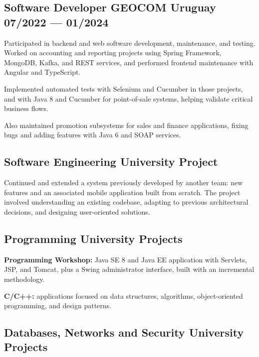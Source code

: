 \documentclass[letter,10pt]{article}
\begin{document}
\subsection{Software Developer \hfill GEOCOM Uruguay \hfill 07/2022 --- 01/2024}

Participated in backend and web software development, maintenance, and testing. Worked on accounting and reporting projects using Spring Framework, MongoDB, Kafka, and REST services, and performed frontend maintenance with Angular and TypeScript.

Implemented automated tests with Selenium and Cucumber in those projects, and with Java 8 and Cucumber for point-of-sale systems, helping validate critical business flows.

Also maintained promotion subsystems for sales and finance applications, fixing bugs and adding features with Java 6 and SOAP services.

\vspace{5mm}

\subsection{{Software Engineering \hfill University Project}}
Continued and extended a system previously developed by another team: new features and an associated mobile application built from scratch. The project involved understanding an existing codebase, adapting to previous architectural decisions, and designing user-oriented solutions.

\vspace{5mm}

\subsection{{Programming \hfill University Projects}}

\textbf{Programming Workshop:} Java SE 8 and Java EE application with Servlets, JSP, and Tomcat, plus a Swing administrator interface, built with an incremental methodology.

\textbf{C/C++:} applications focused on data structures, algorithms, object-oriented programming, and design patterns.

\vspace{5mm}

\subsection{{Databases, Networks and Security \hfill University Projects}}
\end{document}
